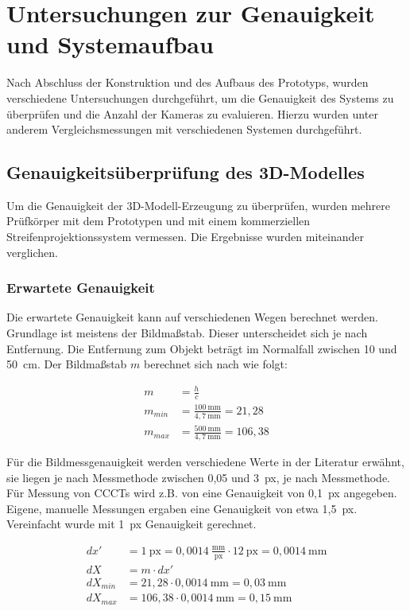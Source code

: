 \documentclass[./00PhotoBox.tex]{subfiles}
\begin{document}
\chapter{Untersuchungen zur Genauigkeit und Systemaufbau}
Nach Abschluss der Konstruktion und des Aufbaus des Prototyps, wurden verschiedene Untersuchungen durchgeführt, um die Genauigkeit des Systems zu überprüfen und die Anzahl der Kameras zu evaluieren. Hierzu wurden unter anderem Vergleichsmessungen mit verschiedenen Systemen durchgeführt.

\section{Genauigkeitsüberprüfung des 3D-Modelles}
Um die Genauigkeit der 3D-Modell-Erzeugung zu überprüfen, wurden mehrere Prüfkörper mit dem Prototypen und mit einem kommerziellen Streifenprojektionssystem vermessen. Die Ergebnisse wurden miteinander verglichen.

\subsection{Erwartete Genauigkeit}
Die erwartete Genauigkeit kann auf verschiedenen Wegen berechnet werden. Grundlage ist meistens der Bildmaßstab. Dieser unterscheidet sich je nach Entfernung. Die Entfernung zum Objekt beträgt im Normalfall zwischen 10 und 50~cm. Der Bildmaßstab $m$ berechnet sich nach \cite[S. 171]{luhmann} wie folgt:

\begin{align}
    m       & = \frac{h}{c}                                  \\
    m_{min} & = \frac{100~\text{mm}}{4,7~\text{mm}} = 21,28  \\
    m_{max} & = \frac{500~\text{mm}}{4,7~\text{mm}} = 106,38
\end{align}

Für die Bildmessgenauigkeit werden verschiedene Werte in der Literatur erwähnt, sie liegen je nach Messmethode zwischen 0,05 und 3~px, je nach Messmethode. Für Messung von CCCTs wird z.B. von \cite{soot2015} eine Genauigkeit von 0,1~px angegeben.
Eigene, manuelle Messungen ergaben eine Genauigkeit von etwa 1,5~px. Vereinfacht wurde mit 1~px Genauigkeit gerechnet.

\begin{align}
    dx'      & = 1~\text{px} = 0,0014~\frac{\text{mm}}{\text{px}} \cdot 12~\text{px} = 0,0014~\text{mm} \\
    dX       & = m \cdot dx'                                                                            \\
    dX_{min} & = 21,28 \cdot 0,0014~\text{mm} = 0,03~\text{mm}                                          \\
    dX_{max} & = 106,38 \cdot 0,0014~\text{mm} = 0,15~\text{mm}
\end{align}
\end{document}
